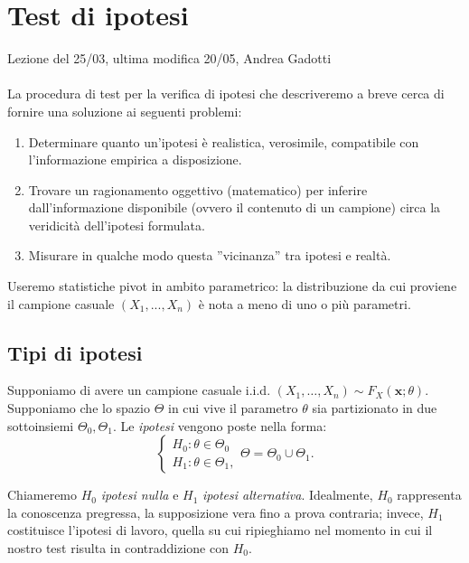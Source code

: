 
\section{Test di ipotesi}
Lezione del 25/03, ultima modifica 20/05, Andrea Gadotti
\\ \\

La procedura di test per la verifica di ipotesi che descriveremo a breve cerca di fornire una soluzione ai seguenti problemi:
\begin{enumerate}
\item Determinare quanto un'ipotesi è realistica, verosimile, compatibile con l'informazione empirica a disposizione.
\item Trovare un ragionamento oggettivo (matematico) per inferire dall'informazione disponibile (ovvero il contenuto di un campione) circa la veridicità dell'ipotesi formulata.
\item Misurare in qualche modo questa ''vicinanza'' tra ipotesi e realtà.
\end{enumerate}
Useremo statistiche pivot in ambito parametrico: la distribuzione da cui proviene il campione casuale $(X_1,...,X_n)$ è nota a meno di uno o più parametri.\\

\subsection{Tipi di ipotesi} 
Supponiamo di avere un campione casuale i.i.d.
\((X_1,\dots,X_n) \sim F_X(\mathbf{x}; \theta)\). Supponiamo che lo spazio \(\Theta{}\) in cui vive il parametro \(\theta{}\) sia partizionato in due sottoinsiemi \(\Theta_0, \Theta_1\). Le \emph{ipotesi} vengono poste nella forma:
\begin{equation}
  \begin{cases}
    H_0 \colon \theta \in \Theta_0 \\
    H_1 \colon \theta \in \Theta_1,
  \end{cases}
  \Theta = \Theta_0 \cup \Theta_1.
\end{equation}

Chiameremo \(H_0\) \emph{ipotesi nulla} e \(H_1\) \emph{ipotesi alternativa}. Idealmente, \(H_0\) rappresenta la conoscenza pregressa, la supposizione vera fino a prova contraria; invece, \(H_1\) costituisce l'ipotesi di lavoro, quella su cui ripieghiamo nel momento in cui il nostro test risulta in contraddizione con \(H_0\).

